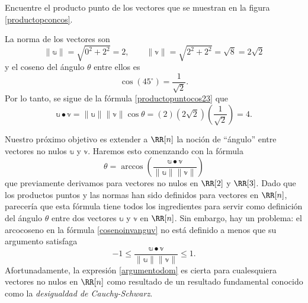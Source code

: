 \begin{examplebox}{}{}
    Encuentre el producto punto de los vectores que se muestran en la figura \ref{productopconcos}.

    \tcblower
    \solucion La norma de los vectores son
    $$\| \mathbb{u} \| = \sqrt{0^2 + 2^2} = 2, \qquad \| \mathbb{v} \| = \sqrt{2^2 + 2^2} = \sqrt{8} = 2\sqrt{2}$$
    y el coseno del ángulo $\theta$ entre ellos es
    $$\cos(45^{\circ}) = \frac{1}{\sqrt{2}}.$$
    Por lo tanto, se sigue de la fórmula \eqref{productopuntocos23} que
    $$\mathbb{u} \bullet \mathbb{v} = \| \mathbb{u} \| \| \mathbb{v} \| \cos \theta = (2) \left( 2\sqrt{2} \right) \left( \frac{1}{\sqrt{2}} \right) = 4.$$
\end{examplebox}
Nuestro próximo objetivo es extender a $\RR[n]$ la noción de “ángulo” entre vectores no nulos $\mathbb{u}$ y $\mathbb{v}$. Haremos esto comenzando con la fórmula
\begin{equation}
    \theta = \arccos\left(\frac{\mathbb{u} \bullet \mathbb{v}}{\|\mathbb{u}\| \|\mathbb{v}\|}\right) \label{cosenoinvanguv}
\end{equation}
que previamente derivamos para vectores no nulos en $\RR[2]$ y $\RR[3]$. Dado que los productos puntos y las normas han sido definidos para vectores en $\RR[n]$, parecería que esta fórmula tiene todos los ingredientes para servir como definición del ángulo $\theta$ entre dos vectores $\mathbb{u}$ y $\mathbb{v}$ en $\RR[n]$. Sin embargo, hay un problema: el arcocoseno en la fórmula \eqref{cosenoinvanguv} no está definido a menos que su argumento satisfaga
\begin{equation}
    -1 \leq \frac{\mathbb{u} \bullet \mathbb{v}}{\|\mathbb{u}\| \|\mathbb{v}\|} \leq 1. \label{argumentodom}
\end{equation}
Afortunadamente, la expresión \eqref{argumentodom} es cierta para cualesquiera vectores no nulos en $\RR[n]$ como resultado de un resultado fundamental conocido como la \emph{desigualdad de Cauchy-Schwarz}.


